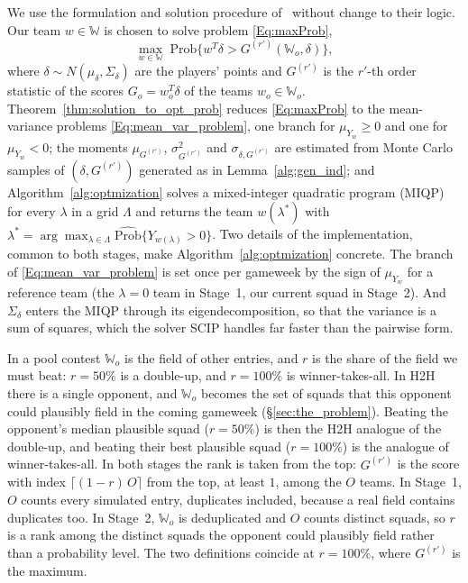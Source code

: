 \documentclass[12pt,oneside,a4paper]{book}
\theoremstyle{definition}
\theoremstyle{remark}
\begin{document}
	We use the formulation and solution procedure of~\cite{haugh2021play} without change to their
	logic. Our team $w \in \mathbb{W}$ is chosen to solve problem \eqref{Eq:maxProb},
	\[
	\max_{w\in\mathbb{W}} \; \mathrm{Prob}\bigl\{ w^{T}\delta > G^{(r')}(\mathbb{W}_o,\delta) \bigr\},
	\]
	where $\delta \sim N(\mu_\delta,\Sigma_\delta)$ are the players' points and $G^{(r')}$ is the
	$r'$-th order statistic of the scores $G_o = w_o^{T}\delta$ of the teams $w_o\in\mathbb{W}_o$.
	Theorem~\ref{thm:solution_to_opt_prob} reduces \eqref{Eq:maxProb} to the mean-variance problems \eqref{Eq:mean_var_problem}, one branch for
	$\mu_{Y_w}\ge 0$ and one for $\mu_{Y_w}<0$; the moments $\mu_{G^{(r')}}$,
	$\sigma^2_{G^{(r')}}$ and $\sigma_{\delta,G^{(r')}}$ are estimated from Monte Carlo samples
	of $(\delta,G^{(r')})$ generated as in Lemma~\ref{alg:gen_ind}; and Algorithm~\ref{alg:optmization} solves a mixed-integer
	quadratic program (MIQP) for every $\lambda$ in a grid $\Lambda$ and returns the team $w(\lambda^*)$
	with $\lambda^* = \arg\max_{\lambda\in\Lambda}\widehat{\mathrm{Prob}}\{Y_{w(\lambda)}>0\}$.
	Two details of the implementation, common to both stages, make Algorithm~\ref{alg:optmization} concrete. The branch
	of \eqref{Eq:mean_var_problem} is set once per gameweek by the sign of $\mu_{Y_w}$ for a reference team (the
	$\lambda=0$ team in Stage~1, our current squad in Stage~2). And $\Sigma_\delta$ enters the MIQP
	through its eigendecomposition, so that the variance is a sum of squares, which the solver SCIP
	handles far faster than the pairwise form.

	In a pool contest $\mathbb{W}_o$ is the field of other entries, and $r$ is the share of the
	field we must beat: $r=50\%$ is a double-up, and $r=100\%$ is winner-takes-all. In H2H there is
	a single opponent, and $\mathbb{W}_o$ becomes the set of squads that this opponent could
	plausibly field in the coming gameweek (\S\ref{sec:the_problem}). Beating the opponent's median plausible squad
	($r=50\%$) is then the H2H analogue of the double-up, and beating their best plausible squad
	($r=100\%$) is the analogue of winner-takes-all. In both stages the rank is taken from the top:
	$G^{(r')}$ is the score with index $\lceil (1-r)\,O\rceil$ from the top, at least $1$, among the
	$O$ teams. In Stage~1, $O$ counts every simulated entry, duplicates included, because a real
	field contains duplicates too. In Stage~2, $\mathbb{W}_o$ is deduplicated and $O$ counts
	distinct squads, so $r$ is a rank among the distinct squads the opponent could plausibly field
	rather than a probability level. The two definitions coincide at $r=100\%$, where $G^{(r')}$ is
	the maximum.
\end{document}
